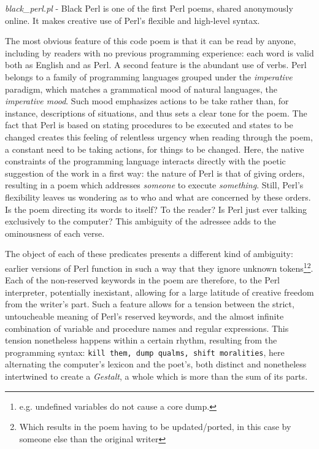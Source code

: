 \begin{listing}
  \inputminted{perl}{./corpus/black_perl.pl}
  \caption{\emph{black\_perl.pl} - Black Perl is one of the first Perl poems, shared anonymously online. It makes creative use of Perl's flexible and high-level syntax.}
  \label{code:black_perl}
\end{listing}

The most obvious feature of this code poem is that it can be read by anyone, including by readers with no previous programming experience: each word is valid both as English and as Perl. A second feature is the abundant use of verbs. Perl belongs to a family of programming languages grouped under the \emph{imperative} paradigm, which matches a grammatical mood of natural languages, the \emph{imperative mood}. Such mood emphasizes actions to be take rather than, for instance, descriptions of situations, and thus sets a clear tone for the poem. The fact that Perl is based on stating procedures to be executed and states to be changed creates this feeling of relentless urgency when reading through the poem, a constant need to be taking actions, for things to be changed. Here, the native constraints of the programming language interacts directly with the poetic suggestion of the work in a first way: the nature of Perl is that of giving orders, resulting in a poem which addresses \emph{someone} to execute \emph{something}. Still, Perl's flexibility leaves us wondering as to who and what are concerned by these orders. Is the poem directing its words to itself? To the reader? Is Perl just ever talking exclusively to the computer? This ambiguity of the adressee adds to the ominousness of each verse.

The object of each of these predicates presents a different kind of ambiguity: earlier versions of Perl function in such a way that they ignore unknown tokens\footnote{e.g. undefined variables do not cause a core dump.}\footnote{Which results in the poem having to be updated/ported, in this case by someone else than the original writer}. Each of the non-reserved keywords in the poem are therefore, to the Perl interpreter, potentially inexistant, allowing for a large latitude of creative freedom from the writer's part. Such a feature allows for a tension between the strict, untoucheable meaning of Perl's reserved keywords, and the almost infinite combination of variable and procedure names and regular expressions. This tension nonetheless happens within a certain rhythm, resulting from the programming syntax: \lstinline{kill them, dump qualms, shift moralities}, here alternating the computer's lexicon and the poet's, both distinct and nonetheless intertwined to create a \emph{Gestalt}, a whole which is more than the sum of its parts.

